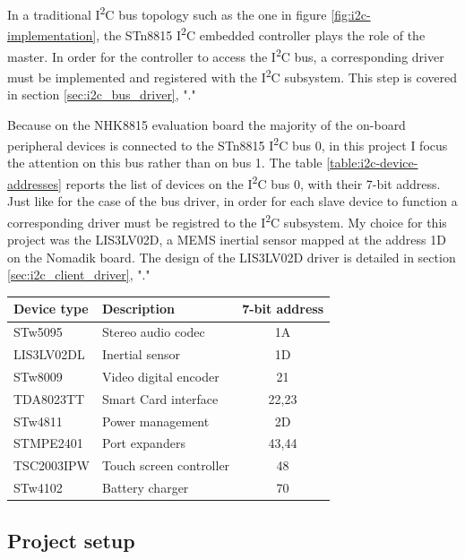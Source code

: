 \documentclass[a4paper,10pt]{article}
\makeatletter
\newenvironment{tablehere}{\def\@captype{table}}{}
\newcommand{\icc}{I\textsuperscript{2}C }
\makeatother
\begin{document}
\begin{multicols}{2}
In a traditional \icc bus topology such as the one in figure
\ref{fig:i2c-implementation}, the STn8815 \icc embedded controller plays the
role of the master. In order for the controller to access the \icc bus, a
corresponding driver must be implemented and registered with the \icc
subsystem. This step is covered in section \ref{sec:i2c_bus_driver},
"."

Because on the NHK8815 evaluation board the majority of the on-board peripheral
devices is connected to the STn8815 \icc bus 0, in this project I focus the
attention on this bus rather than on bus 1.
The table \ref{table:i2c-device-addresses} reports the list of devices on 
the \icc bus 0, with their 7-bit address.
Just like for the case of the bus driver, in order for each slave device
to function a corresponding driver must be registred to the \icc subsystem.
My choice for this project was the LIS3LV02D, a MEMS inertial sensor mapped
at the address 1D on the Nomadik board.
The design of the LIS3LV02D driver is detailed in section
\ref{sec:i2c_client_driver}, "."\\[6pt]

\begin{tablehere}
	\centering
	\renewcommand{\arraystretch}{1.2}	
	\begin{tabular}{l l c}
		\hline
		Device type & Description & 7-bit address \\
		\hline
		STw5095 & Stereo audio codec & 1A \\
		LIS3LV02DL & Inertial sensor & 1D \\
		STw8009 & Video digital encoder	 & 21 \\
		TDA8023TT & Smart Card interface & 22,23 \\
		STw4811 & Power management & 2D \\
		STMPE2401 & Port expanders & 43,44 \\
		TSC2003IPW & Touch screen controller & 48 \\
		STw4102 & Battery charger & 70 \\
		\hline
	\end{tabular}
	\caption{NHK8815 \icc device address map.}
	\label{table:i2c-device-addresses}
\end{tablehere}



\subsection{Project setup}
\label{sec:project_setup}


\end{multicols}
\end{document}
